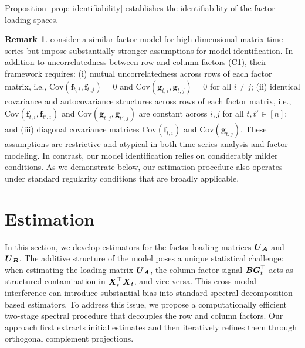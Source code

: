 \documentclass[11pt,letterpaper]{article}
\newcommand{\bfm}[1]{\ensuremath{\boldsymbol{#1}}} %
\def\bg{\bfm g}   \def\bG{\bfm G}  \def\GG{\mathbb{G}}
\theoremstyle{definition}
\newtheorem{remark}{Remark}
\newcommand{\bfv}{\mathbf{f}}
\begin{document}
Proposition \ref{prop: identifiability} establishes the identifiability of the factor loading spaces.



\begin{remark}
\label{remark:1}
\cite{yuan2023twoway} consider a similar factor model for high-dimensional matrix time series but impose substantially stronger assumptions for model identification. In addition to uncorrelatedness between row and column factors (C1), their framework requires: (i) mutual uncorrelatedness across rows of each factor matrix, i.e., $\text{Cov}(\bfv_{t, i}, \bfv_{t,j}) = 0$ and $\text{Cov}(\bg_{t, i}, \bg_{t,j}) = 0 $ for all $ i \neq j$; (ii) identical covariance and autocovariance structures across rows of each factor matrix, i.e., $\text{Cov}(\bfv_{t, i}, \bfv_{t', i})$ and $\text{Cov}(\bg_{t,j}, \bg_{t',j} )$ are constant across $i,j$ for all $t, t' \in [n]$; and (iii) diagonal covariance matrices $\text{Cov}(\bfv_{t, i})$ and $\text{Cov}(\bg_{t,j})$. These assumptions are restrictive and atypical in both time series analysis and factor modeling. In contrast, our model identification relies on considerably milder conditions. As we demonstrate below, our estimation procedure also operates under standard regularity conditions that are broadly applicable.

\end{remark}








\section{Estimation}
\label{sec:estimation}



In this section, we develop estimators for the factor loading matrices $\bU_{\bA}$ and $\bU_{\bB}$. The additive structure of the model poses a unique statistical challenge: when estimating the loading matrix $\bU_{\bA}$, the column-factor signal $\bB\bG_t^\top$ acts as structured contamination in $\bX_t^\top \bX_t$, and vice versa. This cross-modal interference can introduce substantial bias into standard spectral decomposition based estimators. To address this issue, we propose a computationally efficient two-stage spectral procedure that decouples the row and column factors. Our approach first extracts initial estimates and then iteratively refines them through orthogonal complement projections.
\end{document}
